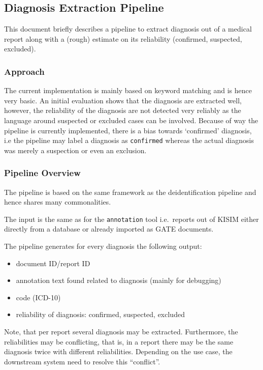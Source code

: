 \subsection{Diagnosis Extraction
Pipeline}\label{diagnosis-extraction-pipeline}

This document briefly describes a pipeline to extract diagnosis out of a
medical report along with a (rough) estimate on its reliability
(confirmed, suspected, excluded).

\subsubsection{Approach}\label{approach}

The current implementation is mainly based on keyword matching and is
hence very basic. An initial evaluation shows that the diagnosis are
extracted well, however, the reliability of the diagnosis are not
detected very reliably as the language around suspected or excluded
cases can be involved. Because of way the pipeline is currently
implemented, there is a bias towards `confirmed' diagnosis, i.e the
pipeline may label a diagnosis as \texttt{confirmed} whereas the actual
diagnosis was merely a suspection or even an exclusion.

\subsubsection{Pipeline Overview}\label{pipeline-overview}

The pipeline is based on the same framework as the deidentification
pipeline and hence shares many commonalities.

The input is the same as for the \texttt{annotation} tool i.e.~reports
out of KISIM either directly from a database or already imported as GATE
documents.

The pipeline generates for every diagnosis the following output:

\begin{itemize}
\tightlist
\item
  document ID/report ID
\item
  annotation text found related to diagnosis (mainly for debugging)
\item
  code (ICD-10)
\item
  reliability of diagnosis: confirmed, suspected, excluded
\end{itemize}

Note, that per report several diagnosis may be extracted. Furthermore,
the reliabilities may be conflicting, that is, in a report there may be
the same diagnosis twice with different reliabilities. Depending on the
use case, the downstream system need to resolve this ``conflict''.

